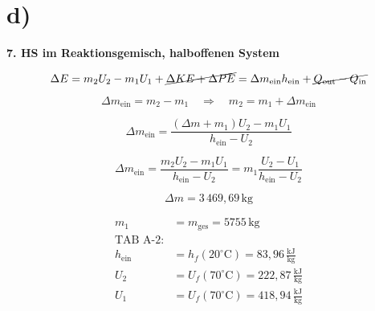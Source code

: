 

\section*{d)}

\textbf{7. HS im Reaktionsgemisch, halboffenen System}

\[
\Delta E = m_2 U_2 - m_1 U_1 + \cancel{ \Delta KE + \Delta PE } = \Delta m_{\text{ein}} h_{\text{ein}} + \cancel{Q_{\text{out}} - Q_{\text{in}}}
\]

\[
\Delta m_{\text{ein}} = m_2 - m_1 \quad \Rightarrow \quad m_2 = m_1 + \Delta m_{\text{ein}}
\]

\[
\Delta m_{\text{ein}} = \frac{( \Delta m + m_1 ) U_2 - m_1 U_1}{h_{\text{ein}} - U_2}
\]

\[
\Delta m_{\text{ein}} = \frac{m_2 U_2 - m_1 U_1}{h_{\text{ein}} - U_2} = m_1 \frac{U_2 - U_1}{h_{\text{ein}} - U_2}
\]

\[
\Delta m = 3 \, 469,69 \, \text{kg}
\]

\[
\begin{aligned}
    m_1 &= m_{\text{ges}} = 5755 \, \text{kg} \\
    \text{TAB A-2:} \\
    h_{\text{ein}} &= h_f (20^\circ \text{C}) = 83,96 \, \frac{\text{kJ}}{\text{kg}} \\
    U_2 &= U_f (70^\circ \text{C}) = 222,87 \, \frac{\text{kJ}}{\text{kg}} \\
    U_1 &= U_f (70^\circ \text{C}) = 418,94 \, \frac{\text{kJ}}{\text{kg}}
\end{aligned}
\]